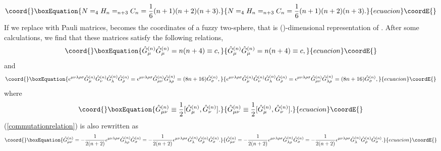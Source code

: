 \documentclass[a4paper,11pt]{article}
\begin{document}
\begin{equation}\coord{}\boxEquation{
N=_{4}H_{n}=_{n+3}C_{n}=\frac{1}{6}(n+1)(n+2)(n+3). 
\label{size}
}{
N=_{4}H_{n}=_{n+3}C_{n}=\frac{1}{6}(n+1)(n+2)(n+3). 
}{ecuacion}\coordE{}\end{equation}
If we replace \myHighlight{$\Gamma_{\mu}$}\coordHE{} with Pauli matrices, 
\coordHE{} becomes the coordinates 
of a fuzzy two-sphere, that is 
(\coordHE{})-dimensional representation of \coordHE{}. 
After some calculations, we find that 
these matrices satisfy the following relations, 
\begin{equation}\coord{}\boxEquation{
\hat{G}_{\mu}^{(n)}\hat{G}_{\mu}^{(n)}=n(n+4) \equiv c, 
\label{ggc}
}{
\hat{G}_{\mu}^{(n)}\hat{G}_{\mu}^{(n)}=n(n+4) \equiv c, 
}{ecuacion}\coordE{}\end{equation}
and 
\begin{equation}\coord{}\boxEquation{
\epsilon^{\mu\nu\lambda\rho\sigma}
\hat{G}_{\mu}^{(n)}\hat{G}_{\nu}^{(n)}
\hat{G}_{\lambda}^{(n)}\hat{G}_{\rho}^{(n)}
=\epsilon^{\mu\nu\lambda\rho\sigma}
\hat{G}_{\mu\nu}^{(n)}
\hat{G}_{\lambda\rho}^{(n)}
=(8n+16)\hat{G}_{\sigma}^{(n)}, 
\label{commutationrelation} 
}{
\epsilon^{\mu\nu\lambda\rho\sigma}
\hat{G}_{\mu}^{(n)}\hat{G}_{\nu}^{(n)}
\hat{G}_{\lambda}^{(n)}\hat{G}_{\rho}^{(n)}
=\epsilon^{\mu\nu\lambda\rho\sigma}
\hat{G}_{\mu\nu}^{(n)}
\hat{G}_{\lambda\rho}^{(n)}
=(8n+16)\hat{G}_{\sigma}^{(n)}, 
}{ecuacion}\coordE{}\end{equation}
where  
\begin{equation}\coord{}\boxEquation{
\hat{G}_{\mu\nu}^{(n)} \equiv \frac{1}{2}
[\hat{G}_{\mu}^{(n)},\hat{G}_{\nu}^{(n)}]. 
\label{GGcomm}
}{
\hat{G}_{\mu\nu}^{(n)} \equiv \frac{1}{2}
[\hat{G}_{\mu}^{(n)},\hat{G}_{\nu}^{(n)}]. 
}{ecuacion}\coordE{}\end{equation}
(\ref{commutationrelation}) is also rewritten as 
\begin{equation}\coord{}\boxEquation{
\hat{G}_{\mu\nu}^{(n)}=-\frac{1}{2(n+2)}
\epsilon^{\mu\nu\lambda\rho\sigma}\hat{G}_{\lambda\rho}^{(n)}
\hat{G}_{\sigma}^{(n)}
=-\frac{1}{2(n+2)}\epsilon^{\mu\nu\lambda\rho\sigma}
\hat{G}_{\lambda}^{(n)}
\hat{G}_{\rho}^{(n)}\hat{G}_{\sigma}^{(n)}. 
}{
\hat{G}_{\mu\nu}^{(n)}=-\frac{1}{2(n+2)}
\epsilon^{\mu\nu\lambda\rho\sigma}\hat{G}_{\lambda\rho}^{(n)}
\hat{G}_{\sigma}^{(n)}
=-\frac{1}{2(n+2)}\epsilon^{\mu\nu\lambda\rho\sigma}
\hat{G}_{\lambda}^{(n)}
\hat{G}_{\rho}^{(n)}\hat{G}_{\sigma}^{(n)}. 
}{ecuacion}\coordE{}\end{equation}
\end{document}
